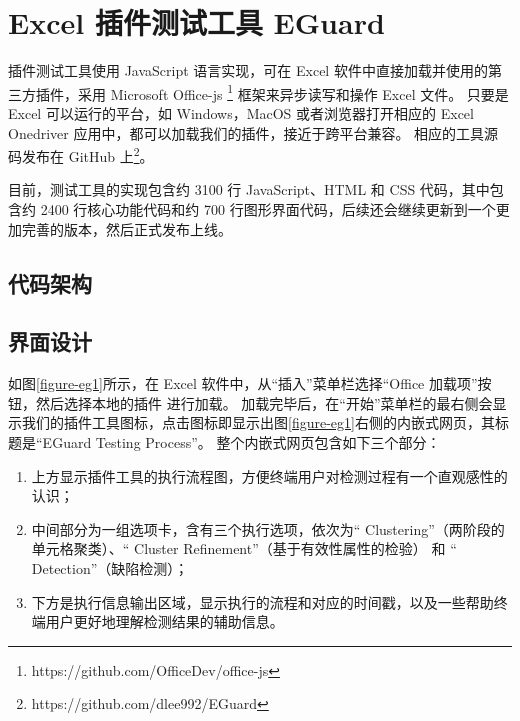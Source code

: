 \section{Excel 插件测试工具 EGuard}
\eg 插件测试工具使用 JavaScript 语言实现，可在 Excel 软件中直接加载并使用的第三方插件，采用 Microsoft Office-js \footnote{https://github.com/OfficeDev/office-js} 框架来异步读写和操作 Excel 文件。
只要是 Excel 可以运行的平台，如 Windows，MacOS 或者浏览器打开相应的 Excel Onedriver 应用中，都可以加载我们的\eg 插件，接近于跨平台兼容。
相应的工具源码发布在 GitHub 上\footnote{https://github.com/dlee992/EGuard}。

目前，\eg 测试工具的实现包含约 3100 行 JavaScript、HTML 和 CSS 代码，其中包含约 2400 行核心功能代码和约 700 行图形界面代码，后续还会继续更新到一个更加完善的版本，然后正式发布上线。

\subsection{代码架构}





\subsection{界面设计}
如图\ref{figure-eg1}所示，在 Excel 软件中，从“插入”菜单栏选择“Office 加载项”按钮，然后选择本地的插件 \eg 进行加载。
加载完毕后，在“开始”菜单栏的最右侧会显示我们的插件工具图标，点击图标即显示出图\ref{figure-eg1}右侧的内嵌式网页，其标题是“EGuard Testing Process”。
整个内嵌式网页包含如下三个部分：

\begin{enumerate}
    \item 上方显示\eg 插件工具的执行流程图，方便终端用户对检测过程有一个直观感性的认识；
    \item 中间部分为一组选项卡，含有三个执行选项，依次为“ Clustering”（两阶段的单元格聚类）、“ Cluster Refinement”（基于有效性属性的检验） 和 “ Detection”（缺陷检测）；
    \item 下方是执行信息输出区域，显示执行的流程和对应的时间戳，以及一些帮助终端用户更好地理解检测结果的辅助信息。
\end{enumerate}

